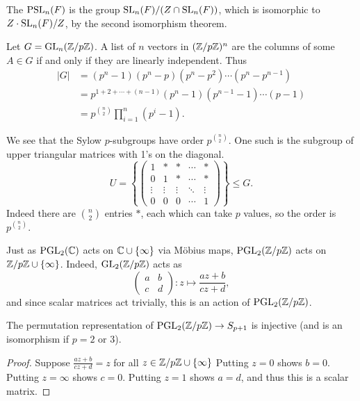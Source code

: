 \documentclass[a4paper]{scrreprt}
\begin{document}
\begin{definition}
	The  $\operatorname{PSL}_n(F)$ is the group $\operatorname{SL}_n(F) / (Z \cap  \operatorname{SL}_n(F))$, which is isomorphic to $Z\cdot \operatorname{SL}_n(F) / Z$, by the second isomorphism theorem.
\end{definition}

\begin{example}
	Let $G = \operatorname{GL}_n(\mathbb{Z}/p\mathbb{Z})$. A list of $n$ vectors in $(\mathbb{Z}/p\mathbb{Z})^n$ are the columns of some $A \in G$ if and only if they are linearly independent.
	Thus
	\begin{align*}
		|G| &= (p^n - 1)(p^n - p)(p^n - p^2) \cdots (p^n - p^{n - 1}) \\
		&= p^{1 + 2 + \cdots + (n - 1)}(p^n - 1)(p^{n - 1} - 1) \cdots (p - 1) \\
		&= p^{\binom{n}{2}} \prod_{i = 1}^n (p^i - 1).
	\end{align*}

	We see that the Sylow $p$-subgroups have order $p^{\binom{n}{2}}$. One such is the subgroup of upper triangular matrices with 1's on the diagonal.
	$$
	U = \left\{\begin{pmatrix}
		1 & * & * & \cdots & * \\
		0 & 1 & * & \cdots & * \\
		\vdots  &\vdots   & \vdots & \ddots &\vdots \\
		0 & 0 & 0 & \cdots & 1
	\end{pmatrix}\right\} \leq G.
	$$
	Indeed there are $\binom{n}{2}$ entries $*$, each which can take $p$ values, so the order is $p^{\binom{n}{2}}$.
\end{example}

Just as $\operatorname{PGL}_2(\mathbb{C})$ acts on $\mathbb{C} \cup \{\infty\}$ via Möbius maps, $\operatorname{PGL}_2(\mathbb{Z}/p\mathbb{Z})$ acts on $\mathbb{Z}/p\mathbb{Z} \cup \{\infty\}$.
Indeed, $\operatorname{GL}_2(\mathbb{Z}/p\mathbb{Z})$ acts as
$$
\begin{pmatrix}
	a & b\\
	c & d
\end{pmatrix}: z \longmapsto \frac{az + b}{cz + d},
$$
and since scalar matrices act trivially, this is an action of $\operatorname{PGL}_2(\mathbb{Z}/p\mathbb{Z})$.

\begin{lemma}
	The permutation representation of $\operatorname{PGL}_2(\mathbb{Z}/p\mathbb{Z}) \rightarrow S_{p + 1}$ is injective (and is an isomorphism if $p = 2$ or 3).
\end{lemma}
\begin{proof}
	Suppose $\frac{az + b}{cz + d} = z$ for all $z \in \mathbb{Z}/p\mathbb{Z} \cup \{\infty\}$ Putting $z = 0$ shows $b = 0$. Putting $z = \infty$ shows $c = 0$. Putting $z = 1$ shows $a = d$, and thus this is a scalar matrix. 
\end{proof}
\end{document}
